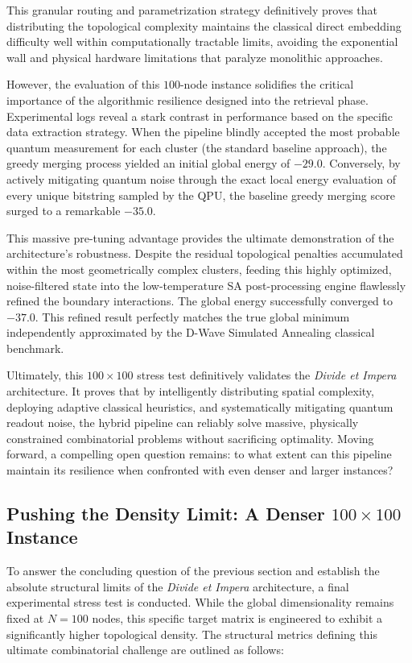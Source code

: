 This granular routing and parametrization strategy definitively proves that distributing the topological complexity maintains the classical direct embedding difficulty well within computationally tractable limits, avoiding the exponential wall and physical hardware limitations that paralyze monolithic approaches.

However, the evaluation of this $100$-node instance solidifies the critical importance of the algorithmic resilience designed into the retrieval phase. Experimental logs reveal a stark contrast in performance based on the specific data extraction strategy. When the pipeline blindly accepted the most probable quantum measurement for each cluster (the standard baseline approach), the greedy merging process yielded an initial global energy of $-29.0$. Conversely, by actively mitigating quantum noise through the exact local energy evaluation of every unique bitstring sampled by the QPU, the baseline greedy merging score surged to a remarkable $-35.0$.

This massive pre-tuning advantage provides the ultimate demonstration of the architecture's robustness. Despite the residual topological penalties accumulated within the most geometrically complex clusters, feeding this highly optimized, noise-filtered state into the low-temperature SA post-processing engine flawlessly refined the boundary interactions. The global energy successfully converged to $-37.0$. This refined result perfectly matches the true global minimum independently approximated by the D-Wave Simulated Annealing classical benchmark.

Ultimately, this $100\times100$ stress test definitively validates the \textit{Divide et Impera} architecture. It proves that by intelligently distributing spatial complexity, deploying adaptive classical heuristics, and systematically mitigating quantum readout noise, the hybrid pipeline can reliably solve massive, physically constrained combinatorial problems without sacrificing optimality. Moving forward, a compelling open question remains: to what extent can this pipeline maintain its resilience when confronted with even denser and larger instances?
\subsection{Pushing the Density Limit: A Denser $100\times100$ Instance}
\label{subsec:divide_et_impera_100x100_dense}

To answer the concluding question of the previous section and establish the absolute structural limits of the \textit{Divide et Impera} architecture, a final experimental stress test is conducted. While the global dimensionality remains fixed at $N=100$ nodes, this specific target matrix is engineered to exhibit a significantly higher topological density. The structural metrics defining this ultimate combinatorial challenge are outlined as follows:

